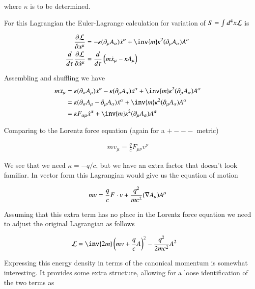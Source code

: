 where $\kappa$ is to be determined.

For this Lagrangian the Euler-Lagrange calculation for variation of $S = \int d^4 x \mathcal{L}$ is

\begin{align*}
\PD{x^\mu}{\LL}
&= - \kappa (\partial_\mu A_\alpha) \xdot^\alpha + \inv{m} \kappa^2 (\partial_\mu A_\alpha) A^\alpha \\
\frac{d}{d\tau} \PD{\xdot^\mu}{\LL} 
&= \frac{d}{d\tau} \left(m \xdot_\mu - \kappa A_\mu \right)
\end{align*}

Assembling and shuffling we have
\begin{align*}
m \xddot_\mu
&= \kappa (\partial_\alpha A_\mu) \xdot^\alpha
- \kappa (\partial_\mu A_\alpha) \xdot^\alpha + \inv{m} \kappa^2 (\partial_\mu A_\alpha) A^\alpha \\
&= \kappa (\partial_\alpha A_\mu - \partial_\mu A_\alpha) \xdot^\alpha + \inv{m} \kappa^2 (\partial_\mu A_\alpha) A^\alpha \\
&= \kappa F_{\alpha\mu} \xdot^\alpha + \inv{m} \kappa^2 (\partial_\mu A_\alpha) A^\alpha \\
\end{align*}

Comparing to the Lorentz force equation (again for a $+---$ metric)

\begin{align*}
m v_\mu = \frac{q}{c} F_{\mu\nu} v^\nu
\end{align*}

We see that we need $\kappa = -q/c$, but we have an extra factor that doesn't look familiar.  In vector form this Lagrangian would give us the
equation of motion

\begin{align*}
m v = \frac{q}{c} F \cdot v + \frac{q^2}{m c^2} (\nabla A_\mu) A^\mu
\end{align*}

Assuming that this extra term has no place in the Lorentz force equation we need to adjust the original Lagrangian as follows

\begin{align}
\LL
&= \inv{2 m}\left( m v + \frac{q}{c} A \right)^2 - \frac{q^2}{ 2 m c^2} A^2
\end{align}

Expressing this energy density in terms of the canonical momentum is 
somewhat interesting.  It provides some extra structure, allowing for a loose identification of the two terms as

